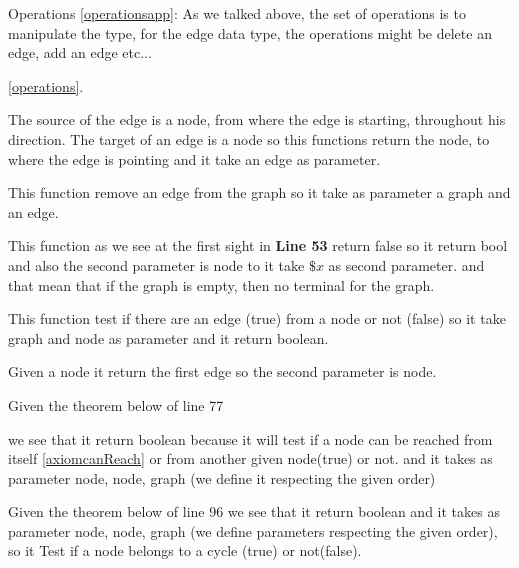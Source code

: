 \item \textcolor{colour0}{Operations\label{operations} \ref{operationsapp}}: As we talked above, the set of operations is to manipulate the type, for the edge data type, the operations might be delete an edge, add an edge etc...


\ref{operations}.

The source of the edge is a node, from where the edge is starting, throughout his direction.
\bigskip\noindent
\label{targetedge}
The target of an edge is a node so this functions return the node, to where the edge is pointing and it take an edge as parameter.
\bigskip\noindent

This function remove an edge from the graph so it take as parameter a graph and an edge.
\bigskip\noindent

This function as we see at the first sight in \textbf{Line 53} return false so it return bool and also the second parameter is node to it take $\$x$ as second parameter.
and that mean that if the graph is empty, then no terminal for the graph.

\bigskip\noindent

This function test if there are an edge (true) from a node or not (false) so it take graph and node as parameter and it return boolean.

\bigskip\noindent

Given a node it return the first edge so the second parameter is node.

\bigskip\noindent

Given the theorem below of line 77 \vspace{-2mm}

we see that it return boolean because it will test if a node can be reached from itself \label{canReachItself} \ref{axiomcanReach} or from another given node(true) or not. and it takes as parameter node, node, graph (we define it respecting the given order)
\bigskip\noindent


Given the theorem below of line 96
 we see that it return boolean and it takes as parameter node, node, graph (we define parameters respecting the given order), so it Test if a node belongs to a cycle (true) or not(false).\\


